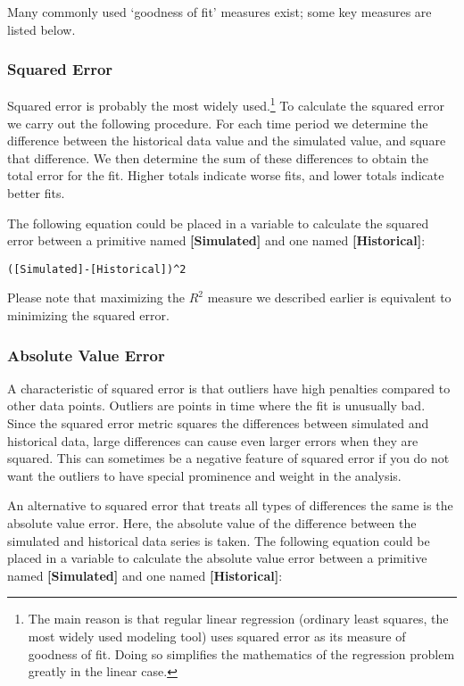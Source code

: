 \documentclass[]{memoir}
\newcommand{\p}[1]{\textbf{{[}#1{]}}}
\begin{document}
Many commonly used `goodness of fit' measures exist; some key measures
are listed below.

\subsubsection{Squared Error}

Squared error is probably the most widely used.\footnote{The main reason
  is that regular linear regression (ordinary least squares, the most
  widely used modeling tool) uses squared error as its measure of
  goodness of fit. Doing so simplifies the mathematics of the regression
  problem greatly in the linear case.} To calculate the squared error we
carry out the following procedure. For each time period we determine the
difference between the historical data value and the simulated value,
and square that difference. We then determine the sum of these
differences to obtain the total error for the fit. Higher totals
indicate worse fits, and lower totals indicate better fits.

The following equation could be placed in a variable to calculate the
squared error between a primitive named \p{Simulated} and one named
\p{Historical}:

\lstinline!([Simulated]-[Historical])^2!

Please note that maximizing the $R^2$ measure we described earlier is
equivalent to minimizing the squared error.

\subsubsection{Absolute Value Error}

A characteristic of squared error is that outliers have high penalties
compared to other data points. Outliers are points in time where the fit
is unusually bad. Since the squared error metric squares the differences
between simulated and historical data, large differences can cause even
larger errors when they are squared. This can sometimes be a negative
feature of squared error if you do not want the outliers to have special
prominence and weight in the analysis.

An alternative to squared error that treats all types of differences the
same is the absolute value error. Here, the absolute value of the
difference between the simulated and historical data series is taken.
The following equation could be placed in a variable to calculate the
absolute value error between a primitive named \p{Simulated} and one
named \p{Historical}:
\end{document}
